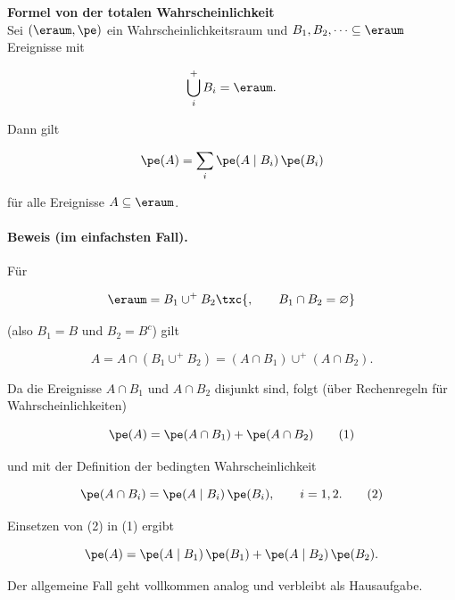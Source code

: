 \begin{defi}
    \textbf{Formel von der totalen Wahrscheinlichkeit}   \\
    Sei \((\eraum,\pe)\) ein Wahrscheinlichkeitsraum und 
    \(B_1,B_2,\dots \subseteq \eraum\)  Ereignisse mit

    \[
        \bigcup^+_i B_i = \eraum.
    \]

    Dann gilt

    \[
        \pe(A)
        =
        \sum_i \pe(A\mid B_i)\,\pe(B_i)
    \]

    für alle Ereignisse \(A \subseteq \eraum\).


    \paragraph{Beweis (im einfachsten Fall).}

    Für

    \[
        \eraum = B_1 \cup^+ B_2\txc{,
            \qquad
            B_1 \cap B_2 = \varnothing}
    \]

    (also \(B_1=B\) und \(B_2=B^c\)) gilt

    \[
        A
        =
        A \cap (B_1 \cup^+ B_2)
        =
        (A\cap B_1)\cup^+(A\cap B_2).
    \]

    Da die Ereignisse \(A\cap B_1\) und \(A\cap B_2\) disjunkt sind, folgt (über Rechenregeln für Wahrscheinlichkeiten)

    \[
        \pe(A)
        =
        \pe(A\cap B_1)+\pe(A\cap B_2)
        \tag{1}
    \]

    und mit der Definition der bedingten Wahrscheinlichkeit

    \[
        \pe(A\cap B_i)
        =
        \pe(A\mid B_i)\,\pe(B_i),
        \qquad i=1,2.
        \tag{2}
    \]

    Einsetzen von (2) in (1) ergibt

    \[
        \pe(A)
        =
        \pe(A\mid B_1)\,\pe(B_1)
        +
        \pe(A\mid B_2)\,\pe(B_2).
    \]

    Der allgemeine Fall geht vollkommen analog und verbleibt als Hausaufgabe.
\end{defi}
